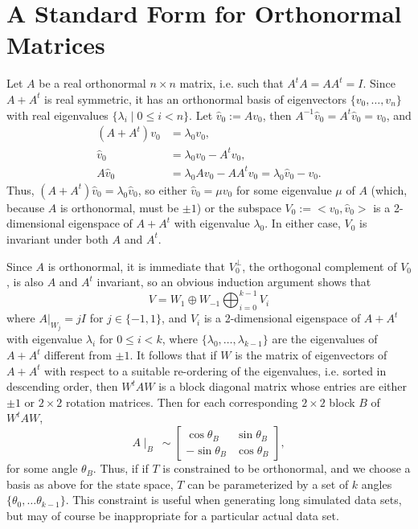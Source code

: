 \documentclass[12pt,leqno]{article}
\begin{document}
\section{A Standard Form for Orthonormal Matrices}\label{ortho_std_form}
Let $A$ be a real orthonormal $n\times n$ matrix, i.e. such that $A^tA = AA^t = I$.  Since $A+A^t$ is real
symmetric, it has an  orthonormal basis of eigenvectors    $\{v_0,\dots,v_n\}$ with
real eigenvalues $\{\lambda_i \mid 0\le i < n\}$.
Let $\hat{v}_0 := Av_0$, then $A^{-1} \hat{v}_0 = A^t\hat{v}_0 = v_0$, and 
\begin{align*}
  (A + A^t)v_0 &= \lambda_0 v_0,\\
  \hat{v}_0 & = \lambda_0 v_0 - A^tv_0, \\
  A\hat{v}_0 &= \lambda_0 Av_0 - AA^tv_0 = \lambda_0 \hat{v}_0 - v_0.
\end{align*}
Thus, $(A+A^t)\hat{v}_0 = \lambda_0 \hat{v}_0$, so either $\hat{v}_0 = \mu v_0$ for some eigenvalue $\mu$ of $A$ (which, because $A$ is orthonormal, must be $\pm 1$) or the subspace $V_0:= <v_0,\hat{v}_0>$ is a 2-dimensional eigenspace of $A+A^t$ with eigenvalue $\lambda_0$.  In either case, $V_0$  is invariant under both $A$ and $A^t$.

Since $A$ is orthonormal, it is immediate that $V_0^{\perp}$,
the orthogonal complement of $V_0$, is also $A$ and $A^t$ invariant, so an obvious induction argument shows that
$$
V = W_1\oplus W_{-1} \bigoplus_{i=0}^{k-1} V_i
$$
where $A|_{W_j} = jI$ for $j \in \{-1,1\}$, and $V_i$ is a 2-dimensional eigenspace of $A+A^t$ with eigenvalue $\lambda_i$
for $0\le i < k$, where $\{\lambda_0,\dots,\lambda_{k-1}\}$ are the eigenvalues of $A+A^t$ different
from $\pm 1$.  It follows that if $W$ is the matrix of eigenvectors of $A+A^t$ with respect to a suitable
re-ordering of the eigenvalues, i.e. sorted in descending order, then $W^tAW$ is a block diagonal matrix
whose entries are either $\pm 1$ or $2\times 2$ rotation matrices.  Then for each corresponding $2\times 2$
block $B$ of $W^tAW$,
$$
A\mid_B ~\sim \left[\begin{matrix}
    \cos\theta_B & \sin\theta_B \\
    -\sin\theta_B & \cos\theta_B
  \end{matrix}\right],
$$
for some angle $\theta_B$.  Thus, if if $T$ is constrained to be orthonormal, and we choose a basis as above
for the state space, $T$ can be  parameterized by a set of $k$ angles $\{\theta_0,\dots\theta_{k-1}\}$.  This
constraint is useful when generating long simulated data sets,  but may of course be inappropriate for a particular
actual data set.
\end{document}
